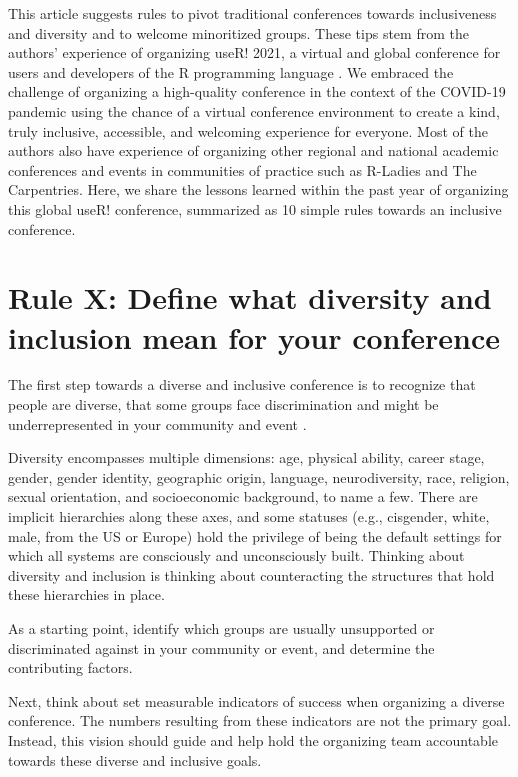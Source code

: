 \documentclass[10pt,letterpaper]{article}
\begin{document}
This article suggests rules to pivot traditional conferences towards inclusiveness and diversity and to welcome minoritized groups. These tips stem from the authors' experience of organizing useR! 2021, a virtual and global conference for users and developers of the R programming language \cite{r_core_team_2021}. We embraced the challenge of organizing a high-quality conference in the context of the COVID-19 pandemic using the chance of a virtual conference environment to create a kind, truly inclusive, accessible, and welcoming experience for everyone. Most of the authors also have experience of  organizing other regional and national academic conferences and events in communities of practice such as R-Ladies and The Carpentries. Here, we share the lessons learned within the past year of organizing this global useR! conference, summarized as 10 simple rules towards an inclusive conference.

\section{Rule X: Define what diversity and inclusion mean for your conference}

The first step towards a diverse and inclusive conference is to recognize that people are diverse, that some groups face discrimination and might be underrepresented in your community and event \cite{timperley_he_2020}. 

Diversity encompasses multiple dimensions: age, physical ability, career stage, gender, gender identity,  geographic origin, language, neurodiversity, race, religion, sexual orientation, and socioeconomic background, to name a few. There are implicit hierarchies along these axes, and some statuses (e.g., cisgender, white, male, from the US or Europe) hold the privilege of being the default settings for which all systems are consciously and unconsciously built. Thinking about diversity and inclusion is thinking about counteracting the structures that hold these hierarchies in place.

As a starting point, identify which groups are usually unsupported or discriminated against in your community or event, and determine the contributing factors.

Next, think about set measurable indicators of success when organizing a diverse conference. The numbers resulting from these indicators are not the primary goal. Instead, this vision should guide and help hold the organizing team accountable towards these diverse and inclusive goals.
\end{document}
